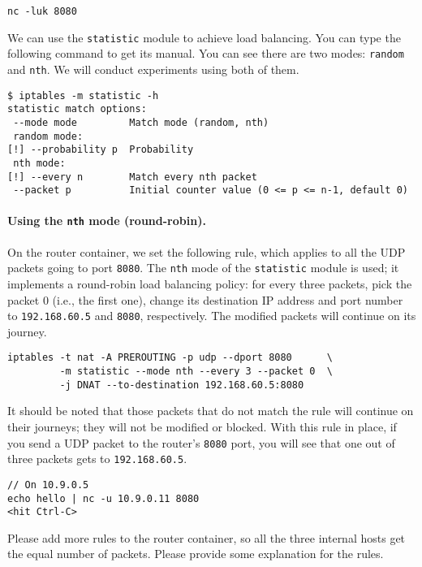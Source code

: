\begin{lstlisting}
nc -luk 8080
\end{lstlisting}

We can use the \texttt{statistic} module to achieve load balancing. 
You can type the following command to get its manual. You can 
see there are two modes: \texttt{random} and \texttt{nth}. 
We will conduct experiments using both of them.

\begin{lstlisting}
$ iptables -m statistic -h 
statistic match options:
 --mode mode         Match mode (random, nth)
 random mode:
[!] --probability p  Probability
 nth mode:
[!] --every n        Match every nth packet
 --packet p          Initial counter value (0 <= p <= n-1, default 0)
\end{lstlisting}
 

\paragraph{Using the \texttt{nth} mode (round-robin).}
On the router container, we set the following rule, which applies 
to all the UDP packets going to port \texttt{8080}. 
The \texttt{nth} mode of the \texttt{statistic} module is used; 
it implements a round-robin load balancing policy: for every
three packets, pick the packet 0 (i.e., the first one), 
change its destination IP address and port number to 
\texttt{192.168.60.5}  and \texttt{8080}, respectively.  
The modified packets will continue on its journey.

\begin{lstlisting}
iptables -t nat -A PREROUTING -p udp --dport 8080      \
         -m statistic --mode nth --every 3 --packet 0  \
         -j DNAT --to-destination 192.168.60.5:8080
\end{lstlisting}

It should be noted that those packets that do not match
the rule will continue on their journeys; they will
not be modified or blocked. With this rule in place, 
if you send a UDP packet to the router's \texttt{8080} port,  
you will see that one out of three packets gets to 
\texttt{192.168.60.5}. 

\begin{lstlisting}
// On 10.9.0.5
echo hello | nc -u 10.9.0.11 8080
<hit Ctrl-C>
\end{lstlisting}
 

Please add more rules to the router container, 
so all the three internal hosts get the equal 
number of packets. 
Please provide some explanation for the rules. 


